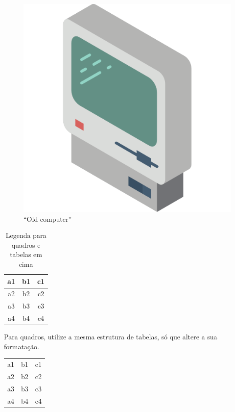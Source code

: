 \begin{figure}[htb]
	\centering
    \includegraphics[scale=0.20]{./072-old-computer} %
	\caption{``Old computer''} 
\end{figure}

\begin{table}[htb]
\caption{Legenda para quadros e tabelas em cima}
\begin{tabular}{|c|c|c|}
\hline
a1 & b1 & c1 \\ \hline
a2 & b2 & c2 \\ \hline
a3 & b3 & c3 \\ \hline
a4 & b4 & c4 \\ \hline
\end{tabular}
\end{table}

Para quadros, utilize a mesma estrutura de tabelas, só que altere a sua formatação.
\begin{quadro}[htb]
\caption{\label{quadro_modelo}Legenda do quadro}
\begin{tabular}{ c c c }
a1 & b1 & c1 \\ 
a2 & b2 & c2 \\ 
a3 & b3 & c3 \\ 
a4 & b4 & c4 \\ 
\end{tabular}
\end{quadro}

